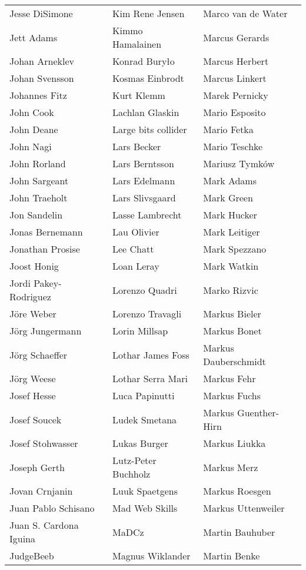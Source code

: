 \begin{tabular}{p{4.5cm}p{4.5cm}p{4.5cm}}
Jesse DiSimone & Kim Rene Jensen & Marco van de Water \\
Jett Adams & Kimmo Hamalainen & Marcus Gerards \\
Johan Arneklev & Konrad Buryło & Marcus Herbert \\
Johan Svensson & Kosmas Einbrodt & Marcus Linkert \\
Johannes Fitz & Kurt Klemm & Marek Pernicky \\
John Cook & Lachlan Glaskin & Mario Esposito \\
John Deane & Large bits collider & Mario Fetka \\
John Nagi & Lars Becker & Mario Teschke \\
John Rorland & Lars Berntsson & Mariusz Tymków \\
John Sargeant & Lars Edelmann & Mark Adams \\
John Traeholt & Lars Slivsgaard & Mark Green \\
Jon Sandelin & Lasse Lambrecht & Mark Hucker \\
Jonas Bernemann & Lau Olivier & Mark Leitiger \\
Jonathan Prosise & Lee Chatt & Mark Spezzano \\
Joost Honig & Loan Leray & Mark Watkin \\
Jordi Pakey-Rodriguez & Lorenzo Quadri & Marko Rizvic \\
Jöre Weber & Lorenzo Travagli & Markus Bieler \\
Jörg Jungermann & Lorin Millsap & Markus Bonet \\
Jörg Schaeffer & Lothar James Foss & Markus Dauberschmidt \\
Jörg Weese & Lothar Serra Mari & Markus Fehr \\
Josef Hesse & Luca Papinutti & Markus Fuchs \\
Josef Soucek & Ludek Smetana & Markus Guenther-Hirn \\
Josef Stohwasser & Lukas Burger & Markus Liukka \\
Joseph Gerth & Lutz-Peter Buchholz & Markus Merz \\
Jovan Crnjanin & Luuk Spaetgens & Markus Roesgen \\
Juan Pablo Schisano & Mad Web Skills & Markus Uttenweiler \\
Juan S. Cardona Iguina & MaDCz & Martin Bauhuber \\
JudgeBeeb & Magnus Wiklander & Martin Benke \\

\end{tabular}
